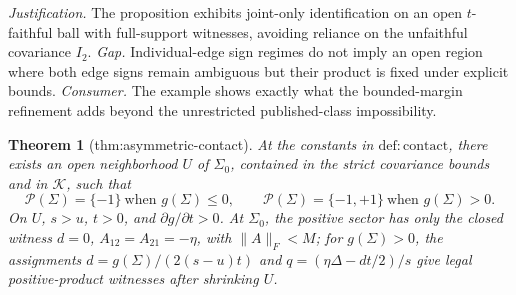 \documentclass{article}
\newtheorem{theorem}{Theorem}
\begin{document}
\par\smallskip\noindent \textit{Justification.} The proposition exhibits joint-only identification on an open \(t\)-faithful ball with full-support witnesses, avoiding reliance on the unfaithful covariance \(I_2\). \textit{Gap.} Individual-edge sign regimes do not imply an open region where both edge signs remain ambiguous but their product is fixed under explicit bounds. \textit{Consumer.} The example shows exactly what the bounded-margin refinement adds beyond the unrestricted published-class impossibility.

\begin{theorem}[thm:asymmetric-contact]\label{thm:asymmetric-contact}
At the constants in \(\mathrm{def:contact}\), there exists an open neighborhood \(U\) of \(\Sigma_0\), contained in the strict covariance bounds and in \(\mathcal K\), such that \[\mathcal P(\Sigma)=\{-1\}\ \text{when }g(\Sigma)\le0,\qquad \mathcal P(\Sigma)=\{-1,+1\}\ \text{when }g(\Sigma)>0.\] On \(U\), \(s>u\), \(t>0\), and \(\partial g/\partial t>0\). At \(\Sigma_0\), the positive sector has only the closed witness \(d=0\), \(A_{12}=A_{21}=-\eta\), with \(\lVert A\rVert_F<M\); for \(g(\Sigma)>0\), the assignments \(d=g(\Sigma)/(2(s-u)t)\) and \(q=(\eta\Delta-dt/2)/s\) give legal positive-product witnesses after shrinking \(U\).
\end{theorem}
\end{document}
